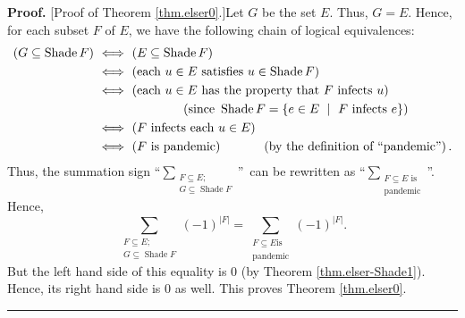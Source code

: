 \documentclass[numbers=enddot,12pt,final,onecolumn]{scrartcl}%
\theoremstyle{definition}
\newenvironment{proof}[1][Proof]{\noindent\textbf{#1.} }{\ \rule{0.5em}{0.5em}}
\let\sumnonlimits\sum
\renewcommand{\sum}{\sumnonlimits\limits}
\newenvironment{vershort}{}{}
\begin{document}
\begin{vershort}
\begin{proof}
[Proof of Theorem \ref{thm.elser0}.]Let $G$ be the set $E$. Thus, $G=E$.
Hence, for each subset $F$ of $E$, we have the following chain of logical
equivalences:%
\begin{align*}
\left(  G\subseteq\operatorname*{Shade}F\right)  \  &  \Longleftrightarrow
\ \left(  E\subseteq\operatorname*{Shade}F\right) \\
&  \Longleftrightarrow\ \left(  \text{each }u\in E\text{ satisfies }%
u\in\operatorname*{Shade}F\right) \\
&  \Longleftrightarrow\ \left(  \text{each }u\in E\text{ has the property that
}F\text{ infects }u\right) \\
&  \ \ \ \ \ \ \ \ \ \ \ \ \ \ \ \ \ \ \ \ \left(  \text{since }%
\operatorname*{Shade}F=\left\{  e\in E\ \mid\ F\text{ infects }e\right\}
\right) \\
&  \Longleftrightarrow\ \left(  F\text{ infects each }u\in E\right) \\
&  \Longleftrightarrow\ \left(  F\text{ is pandemic}\right)
\ \ \ \ \ \ \ \ \ \ \left(  \text{by the definition of \textquotedblleft
pandemic\textquotedblright}\right)  .
\end{align*}
Thus, the summation sign \textquotedblleft$\sum_{\substack{F\subseteq
E;\\G\subseteq\operatorname*{Shade}F}}$\textquotedblright\ can be rewritten as
\textquotedblleft$\sum_{\substack{F\subseteq E\text{ is}\\\text{pandemic}}%
}$\textquotedblright. Hence,%
\[
\sum_{\substack{F\subseteq E;\\G\subseteq\operatorname*{Shade}F}}\left(
-1\right)  ^{\left\vert F\right\vert }=\sum_{\substack{F\subseteq E\text{
is}\\\text{pandemic}}}\left(  -1\right)  ^{\left\vert F\right\vert }.
\]
But the left hand side of this equality is $0$ (by Theorem
\ref{thm.elser-Shade1}). Hence, its right hand side is $0$ as well. This
proves Theorem \ref{thm.elser0}.
\end{proof}
\end{vershort}
\end{document}
